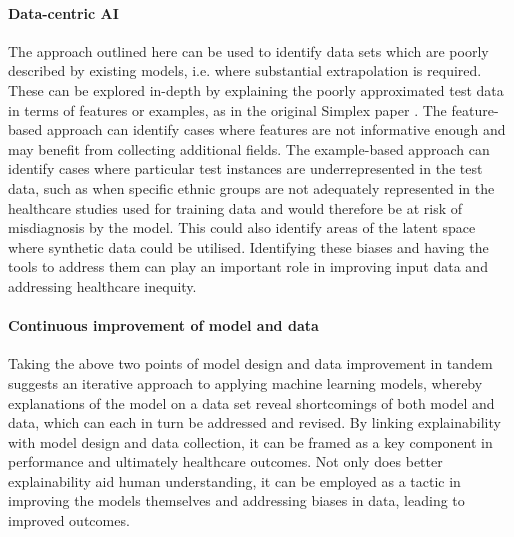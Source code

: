 \documentclass{article}
\begin{document}
\paragraph{Data-centric AI}
The approach outlined here can be used to identify data sets which are poorly described by existing models, i.e. where substantial extrapolation is required.
These can be explored in-depth by explaining the poorly approximated test data in terms of features or examples, as in the original Simplex paper \cite{crabbe_explaining_2021}.
The feature-based approach can identify cases where features are not informative enough and may benefit from collecting additional fields.
The example-based approach can identify cases where particular test instances are underrepresented in the test data,
such as when specific ethnic groups are not adequately represented in the healthcare studies used for training data and would therefore be at risk of misdiagnosis by the model.
This could also identify areas of the latent space where synthetic data could be utilised.
Identifying these biases and having the tools to address them can play an important role in improving input data and addressing healthcare inequity.

\paragraph{Continuous improvement of model and data}
Taking the above two points of model design and data improvement in tandem suggests an iterative approach to applying machine learning models, whereby explanations of the model on a data set reveal shortcomings of both model and data, which can each in turn be addressed and revised.
By linking explainability with model design and data collection, it can be framed as a key component in performance and ultimately healthcare outcomes. Not only does better explainability aid human understanding, it can be employed as a tactic in improving the models themselves and addressing biases in data, leading to improved outcomes.



\clearpage





\end{document}
